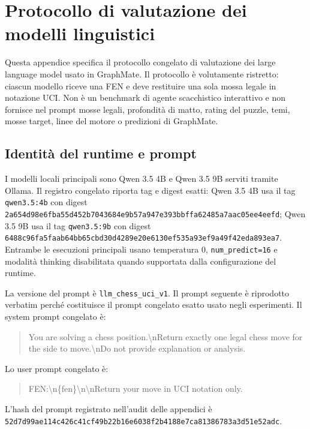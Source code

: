\chapter{Protocollo di valutazione dei modelli linguistici}
\label{app:llm-protocol}

Questa appendice specifica il protocollo congelato di valutazione dei large language model usato in GraphMate.  Il protocollo è volutamente ristretto: ciascun modello riceve una FEN e deve restituire una sola mossa legale in notazione UCI.  Non è un benchmark di agente scacchistico interattivo e non fornisce nel prompt mosse legali, profondità di matto, rating del puzzle, temi, mosse target, linee del motore o predizioni di GraphMate.



\section{Identità del runtime e prompt}
\label{app:llm-protocol:prompt}

I modelli locali principali sono Qwen 3.5 4B e Qwen 3.5 9B serviti tramite Ollama.  Il registro congelato riporta tag e digest esatti: Qwen 3.5 4B usa il tag \texttt{qwen3.5:4b} con digest \nolinkurl{2a654d98e6fba55d452b7043684e9b57a947e393bbffa62485a7aac05ee4eefd}; Qwen 3.5 9B usa il tag \texttt{qwen3.5:9b} con digest \nolinkurl{6488c96fa5faab64bb65cbd30d4289e20e6130ef535a93ef9a49f42eda893ea7}.  Entrambe le esecuzioni principali usano temperatura 0, \texttt{num\_predict=16} e modalità thinking disabilitata quando supportata dalla configurazione del runtime.

La versione del prompt è \texttt{llm\_chess\_uci\_v1}.  Il prompt seguente è riprodotto verbatim perché costituisce il prompt congelato esatto usato negli esperimenti.  Il system prompt congelato è:
\begin{quote}
\small\ttfamily
You are solving a chess position.\textbackslash nReturn exactly one legal chess move for the side to move.\textbackslash nDo not provide explanation or analysis.
\end{quote}
Lo user prompt congelato è:
\begin{quote}
\small\ttfamily
FEN:\textbackslash n\{fen\}\textbackslash n\textbackslash nReturn your move in UCI notation only.
\end{quote}
L'hash del prompt registrato nell'audit delle appendici è \nolinkurl{52d7d99ae114c426c41cf49b22b16e6038f2b4188e7ca81386783a3d51e52adc}.

